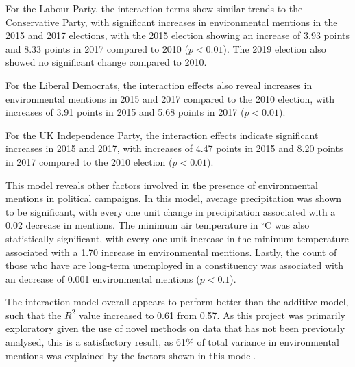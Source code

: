 \documentclass[12pt,letterpaper]{article}
\begin{document}
For the Labour Party, the interaction terms show similar trends to the Conservative Party, with significant increases in environmental mentions in the 2015 and 2017 elections, with the 2015 election showing an increase of 3.93 points and 8.33 points in 2017 compared to 2010 ($p<0.01$). The 2019 election also showed no significant change compared to 2010.

For the Liberal Democrats, the interaction effects also reveal increases in environmental mentions in 2015 and 2017 compared to the 2010 election, with increases of 3.91 points in 2015 and 5.68 points in 2017 ($p<0.01$). 

For the UK Independence Party, the interaction effects indicate significant increases in 2015 and 2017, with increases of 4.47 points in 2015 and 8.20 points in 2017 compared to the 2010 election ($p<0.01$). 

This model reveals other factors involved in the presence of environmental mentions in political campaigns. In this model, average precipitation was shown to be significant, with every one unit change in precipitation associated with a 0.02 decrease in mentions. The minimum air temperature in $^\circ$C was also statistically significant, with every one unit increase in the minimum temperature associated with a 1.70 increase in environmental mentions. Lastly, the count of those who have are long-term unemployed in a constituency was associated with an decrease of 0.001 environmental mentions ($p<0.1$). 

The interaction model overall appears to perform better than the additive model, such that the $R^2$ value increased to 0.61 from 0.57. As this project was primarily exploratory given the use of novel methods on data that has not been previously analysed, this is a satisfactory result, as 61\% of total variance in environmental mentions was explained by the factors shown in this model.





\end{document}
